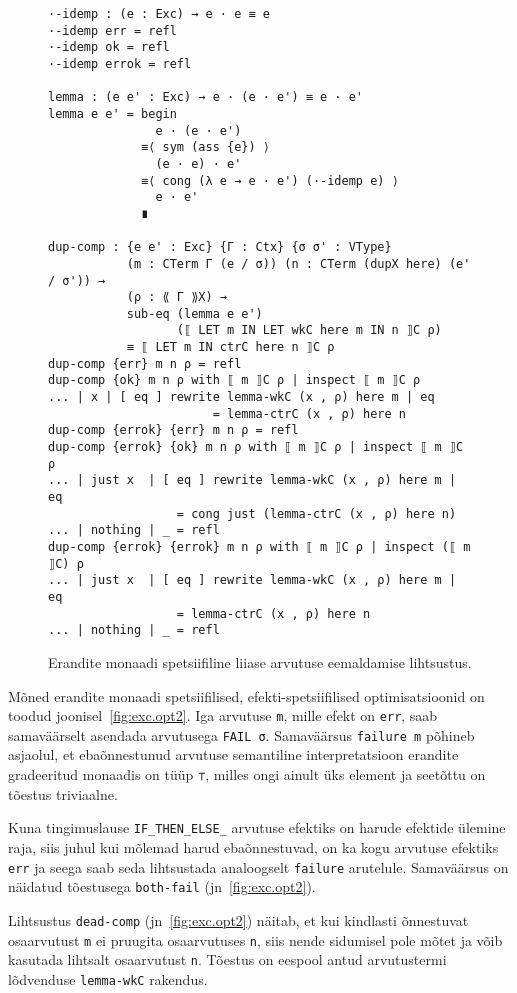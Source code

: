 \documentclass[a4paper,12pt]{article}
\begin{document}
\begin{figure}
  \begin{BVerbatim}
·-idemp : (e : Exc) → e · e ≡ e
·-idemp err = refl
·-idemp ok = refl
·-idemp errok = refl

lemma : (e e' : Exc) → e · (e · e') ≡ e · e'
lemma e e' = begin
               e · (e · e')
             ≡⟨ sym (ass {e}) ⟩
               (e · e) · e'
             ≡⟨ cong (λ e → e · e') (·-idemp e) ⟩
               e · e'
             ∎

dup-comp : {e e' : Exc} {Γ : Ctx} {σ σ' : VType} 
           (m : CTerm Γ (e / σ)) (n : CTerm (dupX here) (e' / σ')) →
           (ρ : ⟪ Γ ⟫X) → 
           sub-eq (lemma e e')
                  (⟦ LET m IN LET wkC here m IN n ⟧C ρ)
           ≡ ⟦ LET m IN ctrC here n ⟧C ρ
dup-comp {err} m n ρ = refl
dup-comp {ok} m n ρ with ⟦ m ⟧C ρ | inspect ⟦ m ⟧C ρ
... | x | [ eq ] rewrite lemma-wkC (x , ρ) here m | eq
                       = lemma-ctrC (x , ρ) here n
dup-comp {errok} {err} m n ρ = refl
dup-comp {errok} {ok} m n ρ with ⟦ m ⟧C ρ | inspect ⟦ m ⟧C ρ
... | just x  | [ eq ] rewrite lemma-wkC (x , ρ) here m | eq
                  = cong just (lemma-ctrC (x , ρ) here n)
... | nothing | _ = refl
dup-comp {errok} {errok} m n ρ with ⟦ m ⟧C ρ | inspect (⟦ m ⟧C) ρ 
... | just x  | [ eq ] rewrite lemma-wkC (x , ρ) here m | eq
                  = lemma-ctrC (x , ρ) here n
... | nothing | _ = refl
  \end{BVerbatim}
  \caption{Erandite monaadi spetsiifiline liiase arvutuse eemaldamise lihtsustus.}
  \label{fig:exc.opt3}
\end{figure}


Mõned erandite monaadi spetsiifilised, efekti-spetsiifilised optimisatsioonid on toodud joonisel~\ref{fig:exc.opt2}.
Iga arvutuse {\tt m}, mille efekt on {\tt err}, saab samaväärselt asendada arvutusega {\tt FAIL σ}.
Samaväärsus {\tt failure m} põhineb asjaolul, et ebaõnnestunud arvutuse semantiline interpretatsioon erandite gradeeritud monaadis on tüüp {\tt ⊤}, milles ongi ainult üks element ja seetõttu on tõestus triviaalne.

Kuna tingimuslause {\tt IF_THEN_ELSE_} arvutuse efektiks on harude efektide ülemine raja, siis juhul kui mõlemad harud ebaõnnestuvad, on ka kogu arvutuse efektiks {\tt err} ja seega saab seda lihtsustada analoogselt {\tt failure} arutelule.
Samaväärsus on näidatud tõestusega {\tt both-fail} (jn~\ref{fig:exc.opt2}).

Lihtsustus {\tt dead-comp} (jn~\ref{fig:exc.opt2}) näitab, et kui kindlasti õnnestuvat osaarvutust {\tt m} ei pruugita osaarvutuses {\tt n}, siis nende sidumisel pole mõtet ja võib kasutada lihtsalt osaarvutust {\tt n}. Tõestus on eespool antud arvutustermi lõdvenduse {\tt lemma-wkC} rakendus.
\end{document}
